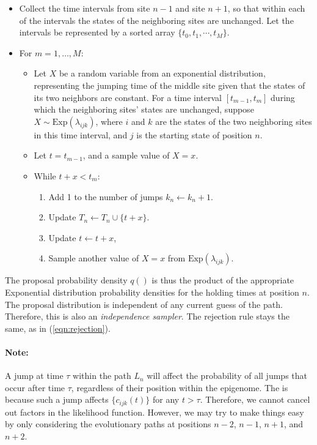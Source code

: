 \documentclass[11pt]{article}
\begin{document}
\begin{itemize}
\item Collect the time intervals from site $n-1$ and site $n+1$, so
  that within each of the intervals the states of the neighboring
  sites are unchanged. Let the intervals be represented by a sorted
  array $\{t_0, t_1, \cdots, t_M\}$.
\item For $m = 1, \ldots, M$:
  \begin{itemize}
  \item Let $X$ be a random variable from an exponential distribution,
    representing the jumping time of the middle site given that the
    states of its two neighbors are constant.  For a time interval
    $[t_{m-1}, t_m]$ during which the neighboring sites' states are
    unchanged, suppose $X\sim \text{Exp}(\lambda_{ijk})$, where $i$
    and $k$ are the states of the two neighboring sites in this time
    interval, and $j$ is the starting state of position $n$.
  \item Let $t = t_{m-1}$, and a sample value of $X=x$.
  \item While $t +x < t_m$:
    \begin{enumerate}[label={(\arabic*)}]
    \item Add 1 to the number of jumps $k_n \leftarrow k_n +1$.
    \item Update $T_n \leftarrow T_n\cup\{t+x\}$.
    \item Update $t \leftarrow  t+x$,
    \item Sample another value of $X=x$ from $\text{Exp}(\lambda_{ijk})$.
    \end{enumerate}
  \end{itemize}
\end{itemize}

The proposal probability density $q()$ is thus the product of the
appropriate Exponential distribution probability densities for the
holding times at position $n$. The proposal distribution is
independent of any current guess of the path. Therefore, this is also
an \textit{independence sampler}. The rejection rule stays the same,
as in (\ref{eqn:rejection}).

\paragraph{Note:} A jump at time $\tau$ within the path $L_{n}$
will affect the probability of all jumps that occur after time $\tau$,
regardless of their position within the epigenome. The is because such
a jump affects $\{c_{ijk}(t)\}$ for any $t > \tau$. Therefore, we
cannot cancel out factors in the likelihood function. However, we may
try to make things easy by only considering the evolutionary paths at
positions $n-2$, $n-1$, $n+1$, and $n+2$.
\end{document}
